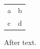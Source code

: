 \documentclass{article}
\begin{document}
\begin{tabular}{ll}
a \!\!{\small x}\!\! & b \\
c & d \\
\end{tabular}

After text.
\end{document}
